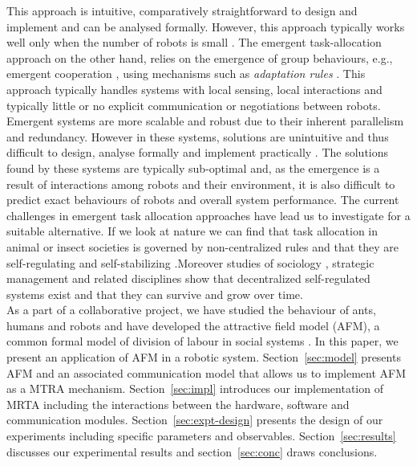 \documentclass{llncs}
\begin{document}
This approach is intuitive, comparatively straightforward to design and implement and can be analysed formally.
However, this approach typically works well only when the number of robots is small \cite{Lerman+2006}.
The emergent task-allocation approach on the other hand, relies on the emergence of group behaviours, e.g., emergent cooperation \cite{Lerman+2006}, using mechanisms such as {\em adaptation rules} \cite{Liu+2007}.
This approach typically handles systems with local sensing, local interactions and typically little or no explicit communication or negotiations between robots.
Emergent systems are more scalable and robust due to their inherent parallelism and redundancy.
However in these systems, solutions are unintuitive and thus difficult to design, analyse formally and implement practically \cite{Gerkey+2004,Lerman+2006}.
The solutions found by these systems are typically sub-optimal and, as the emergence is a result of interactions among robots and their environment, it is also difficult to predict exact behaviours of robots and overall system performance.
The current challenges in emergent task allocation approaches have lead us to investigate for a suitable alternative.
If we look at nature we can find that task allocation in animal or insect societies is governed by non-centralized rules and that they are self-regulating and self-stabilizing \cite{Bonabeau+1999}.Moreover studies of sociology \cite{Sayer+1992}, strategic management \cite{Kogut2000} and related disciplines show that decentralized self-regulated systems exist and that they can survive and grow over time.\\
As a part of a collaborative project, we have studied the behaviour of ants, humans and robots and have developed the attractive field model (AFM), a common formal model of division of labour in social systems \cite{Elsa}.
In this paper, we present an application of AFM in a robotic system.
Section~\ref{sec:model} presents AFM and an associated communication model that allows us to implement AFM as a MTRA mechanism.
Section~\ref{sec:impl} introduces our implementation of MRTA including the interactions between the hardware, software and communication modules.
Section~\ref{sec:expt-design} presents the design of our experiments including specific parameters and observables.
Section~\ref{sec:results} discusses our experimental results and section~\ref{sec:conc} draws conclusions.
\end{document}
